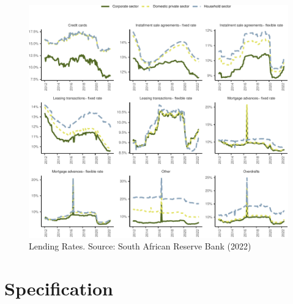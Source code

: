 \documentclass[
]{article}
\begin{document}
\begin{figure}[H]

\includegraphics{Bank_capital_and_bank_lending_files/figure-latex/unnamed-chunk-7-1} \hfill{}

\caption{Lending Rates. Source: South African Reserve Bank (2022)}\label{fig:unnamed-chunk-7}
\end{figure}
\newpage

\hypertarget{specification}{%
\section{Specification}\label{specification}}

\providecommand{\docline}[3]{\noalign{\global\setlength{\arrayrulewidth}{#1}}\arrayrulecolor[HTML]{#2}\cline{#3}}

\setlength{\tabcolsep}{2pt}

\renewcommand*{\arraystretch}{1.5}
\end{document}
